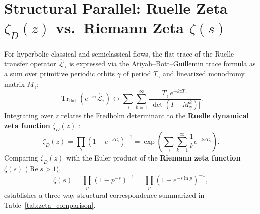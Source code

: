 \documentclass[11pt,a4paper]{article}
\newcommand{\Tr}{\operatorname{Tr}}
\newcommand{\Det}{\operatorname{det}}
\newcommand{\Real}{\operatorname{Re}}
\begin{document}
\section{Structural Parallel: Ruelle Zeta $\zeta_D(z)$ vs.\ Riemann Zeta $\zeta(s)$}

For hyperbolic classical and semiclassical flows, the flat trace of the Ruelle transfer operator $\widehat{\mathcal{L}}_\tau$ is expressed via the Atiyah--Bott--Guillemin trace formula as a sum over primitive periodic orbits $\gamma$ of period $T_\gamma$ and linearized monodromy matrix $M_\gamma$:
\begin{equation}
\Tr_{\mathrm{flat}}\left(e^{-z\tau}\widehat{\mathcal{L}}_\tau\right) \longleftrightarrow \sum_{\gamma} \sum_{k=1}^{\infty} \frac{T_\gamma\, e^{-k z T_\gamma}}{\lvert \Det(I - M_\gamma^k)\rvert}.
\end{equation}
Integrating over $z$ relates the Fredholm determinant to the \textbf{Ruelle dynamical zeta function} $\zeta_D(z)$ \cite{Ruelle1976}:
\begin{equation}
\zeta_D(z) = \prod_{\gamma}\left(1 - e^{-z T_\gamma}\right)^{-1} = \exp\left(\sum_{\gamma}\sum_{k=1}^{\infty} \frac{1}{k} e^{-k z T_\gamma}\right).
\end{equation}
Comparing $\zeta_D(z)$ with the Euler product of the \textbf{Riemann zeta function} $\zeta(s)$ ($\Real s > 1$),
\begin{equation}
\zeta(s) = \prod_{p}\left(1 - p^{-s}\right)^{-1} = \prod_{p}\left(1 - e^{-s \ln p}\right)^{-1},
\end{equation}
establishes a three-way structural correspondence summarized in Table~\ref{tab:zeta_comparison}.
\end{document}

